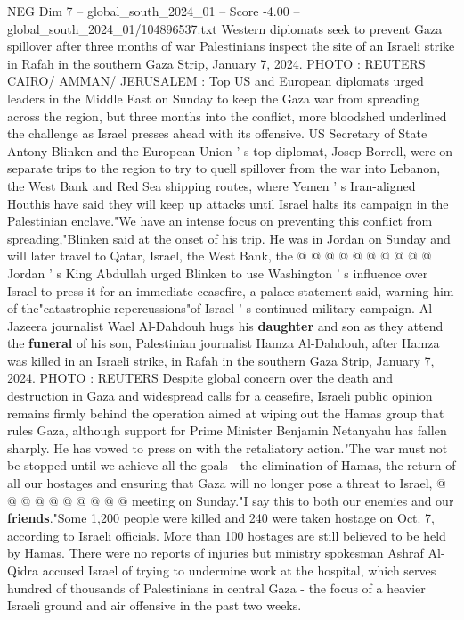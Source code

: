 \begin{textsample}{NEG Dim 7 – global\_south\_2024\_01 – Score -4.00 – global\_south\_2024\_01/104896537.txt}  \label{ex:f7_neg_410}
Western diplomats seek to prevent Gaza spillover after three months of war Palestinians inspect the site of an Israeli strike in Rafah in the southern Gaza Strip, January 7, 2024.
PHOTO : REUTERS CAIRO/ AMMAN/ JERUSALEM : Top US and European diplomats urged leaders in the Middle East on Sunday to keep the Gaza war from spreading across the region, but three months into the conflict, more bloodshed underlined the challenge as Israel presses ahead with its offensive.
US Secretary of State Antony Blinken and the European Union ' s top diplomat, Josep Borrell, were on separate trips to the region to try to quell spillover from the war into Lebanon, the West Bank and Red Sea shipping routes, where Yemen ' s Iran-aligned Houthis have said they will keep up attacks until Israel halts its campaign in the Palestinian enclave."We have an intense focus on preventing this conflict from spreading,"Blinken said at the onset of his trip.
He was in Jordan on Sunday and will later travel to Qatar, Israel, the West Bank, the @ @ @ @ @ @ @ @ @ @ Jordan ' s King Abdullah urged Blinken to use Washington ' s influence over Israel to press it for an immediate ceasefire, a palace statement said, warning him of the"catastrophic repercussions"of Israel ' s continued military campaign.
Al Jazeera journalist Wael Al-Dahdouh hugs his \textbf{daughter} and son as they attend the \textbf{funeral} of his son, Palestinian journalist Hamza Al-Dahdouh, after Hamza was killed in an Israeli strike, in Rafah in the southern Gaza Strip, January 7, 2024.
PHOTO : REUTERS Despite global concern over the death and destruction in Gaza and widespread calls for a ceasefire, Israeli public opinion remains firmly behind the operation aimed at wiping out the Hamas group that rules Gaza, although support for Prime Minister Benjamin Netanyahu has fallen sharply.
He has vowed to press on with the retaliatory action."The war must not be stopped until we achieve all the goals - the elimination of Hamas, the return of all our hostages and ensuring that Gaza will no longer pose a threat to Israel, @ @ @ @ @ @ @ @ @ @ meeting on Sunday."I say this to both our enemies and our \textbf{friends}."Some 1,200 people were killed and 240 were taken hostage on Oct. 7, according to Israeli officials.
More than 100 hostages are still believed to be held by Hamas.
There were no reports of injuries but ministry spokesman Ashraf Al-Qidra accused Israel of trying to undermine work at the hospital, which serves hundred of thousands of Palestinians in central Gaza - the focus of a heavier Israeli ground and air offensive in the past two weeks.

\end{textsample}
